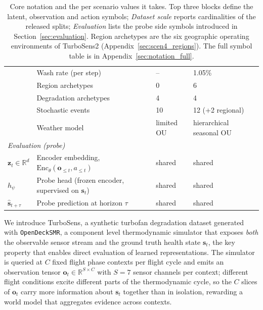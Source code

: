 \documentclass{article}
\begin{document}
\begin{table}[h]
\begin{tabular}{llll}
                                        & Wash rate (per step)                               & --                  & 1.05\%              \\
                                        & Region archetypes                                  & 0                   & 6                   \\
                                        & Degradation archetypes                             & 4                   & 4                   \\
                                        & Stochastic events                                  & 10                  & 12 (+2 regional)    \\
                                        & Weather model                                      & limited OU          & hierarchical seasonal OU \\
\midrule
\multicolumn{4}{l}{\textit{Evaluation (probe)}} \\
$\mathbf{z}_t \in \mathbb{R}^d$         & Encoder embedding, $\mathrm{Enc}_\theta(\mathbf{o}_{\le t}, a_{\le t})$ & shared & shared \\
$h_\psi$                                & Probe head (frozen encoder, supervised on $\mathbf{s}_t$) & shared & shared \\
$\hat{\mathbf{s}}_{t+\tau}$             & Probe prediction at horizon $\tau$                 & shared              & shared              \\
\bottomrule
\end{tabular}
\caption{Core notation and the per scenario values it takes. Top three blocks define the latent, observation and action symbols; \emph{Dataset scale} reports cardinalities of the released splits; \emph{Evaluation} lists the probe side symbols introduced in Section~\ref{sec:evaluation}. Region archetypes are the six geographic operating environments of TurboSens2 (Appendix~\ref{sec:scen4_regions}). The full symbol table is in Appendix~\ref{sec:notation_full}.}
\label{tab:notation}
\end{table}




We introduce TurboSens, a synthetic turbofan degradation dataset generated with \texttt{OpenDeckSMR}, a component level thermodynamic simulator that exposes \emph{both} the observable sensor stream and the ground truth health state $\mathbf{s}_t$, the key property that enables direct evaluation of learned representations. The simulator is queried at $C$ fixed flight phase contexts per flight cycle and emits an observation tensor $\mathbf{o}_t \in \mathbb{R}^{S \times C}$ with $S{=}7$ sensor channels per context; different flight conditions excite different parts of the thermodynamic cycle, so the $C$ slices of $\mathbf{o}_t$ carry more information about $\mathbf{s}_t$ together than in isolation, rewarding a world model that aggregates evidence across contexts.
\end{document}
